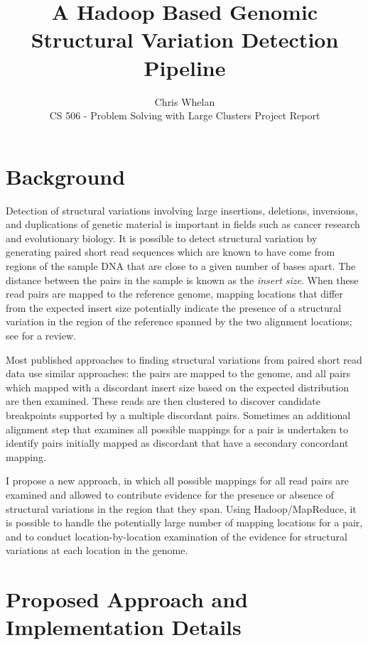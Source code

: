 \documentclass[11pt]{amsart}
\title{ A Hadoop Based Genomic Structural Variation Detection Pipeline }
\author{ 
Chris Whelan \\
CS 506 - Problem Solving with Large Clusters
Project Report
}
\date{}                                           %
\begin{document}
\maketitle

\nonumber

\section{Background}

Detection of structural variations involving large insertions, deletions, inversions, and duplications of genetic material is important in fields such as cancer research and evolutionary biology. It is possible to detect structural variation by generating paired short read sequences which are known to have come from regions of the sample DNA that are close to a given number of bases apart. The distance between the pairs in the sample is known as the {\it insert size}. When these read pairs are mapped to the reference genome, mapping locations that differ from the expected insert size potentially indicate the presence of a structural variation in the region of the reference spanned by the two alignment locations; see \cite{Alkan:2011p547} for a review.

Most published approaches to finding structural variations from paired short read data use similar approaches: the pairs are mapped to the genome, and all pairs which mapped with a discordant insert size based on the expected distribution are then examined. These reads are then clustered to discover candidate breakpoints supported by a multiple discordant pairs. Sometimes an additional alignment step that examines all possible mappings for a pair is undertaken to identify pairs initially mapped as discordant that have a secondary concordant mapping.

I propose a new approach, in which all possible mappings for all read pairs are examined and allowed to contribute evidence for the presence or absence of structural variations in the region that they span. Using Hadoop/MapReduce, it is possible to handle the potentially large number of mapping locations for a pair, and to conduct location-by-location examination of the evidence for structural variations at each location in the genome.

\section{Proposed Approach and Implementation Details}
\end{document}
